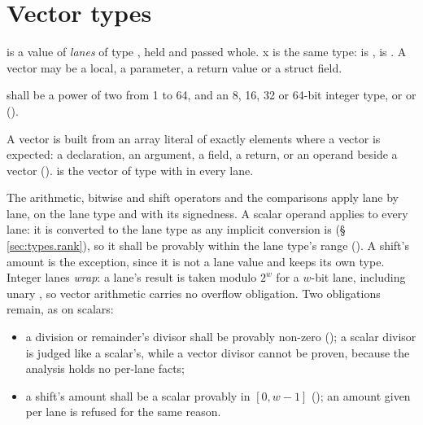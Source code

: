\begin{example}
\end{example}

\section{Vector types}
\label{sec:types.vector}

\pnum
{} is a value of  \emph{lanes} of type , held and passed whole.
x is the same type:  is ,  is
. A vector may be a local, a parameter, a return value or a struct field.

\begin{constraint}
   shall be a power of two from 1 to 64, and  an 8, 16, 32 or 64-bit integer
  type, or  or  ().
\end{constraint}

\pnum
A vector is built from an array literal of exactly  elements where a vector is
expected: a declaration, an argument, a field, a return, or an operand beside a vector
().  is the vector of type  with  in
every lane.

\pnum
The arithmetic, bitwise and shift operators and the comparisons apply lane by lane, on the lane
type and with its signedness. A scalar operand applies to every lane: it is converted to the lane
type as any implicit conversion is (\S\,\ref{sec:types.rank}), so it shall be provably within the
lane type's range (). A shift's amount is the exception, since it is not a lane
value and keeps its own type. Integer lanes \emph{wrap}: a lane's result is taken modulo
$2^w$ for a $w$-bit lane, including unary \lain{-}, so vector arithmetic carries no overflow
obligation. Two obligations remain, as on scalars:
\begin{itemize}
  \item a division or remainder's divisor shall be provably non-zero (); a
        scalar divisor is judged like a scalar's, while a vector divisor cannot be proven,
        because the analysis holds no per-lane facts;
  \item a shift's amount shall be a scalar provably in $[0, w-1]$ (); an amount
        given per lane is refused for the same reason.
\end{itemize}

